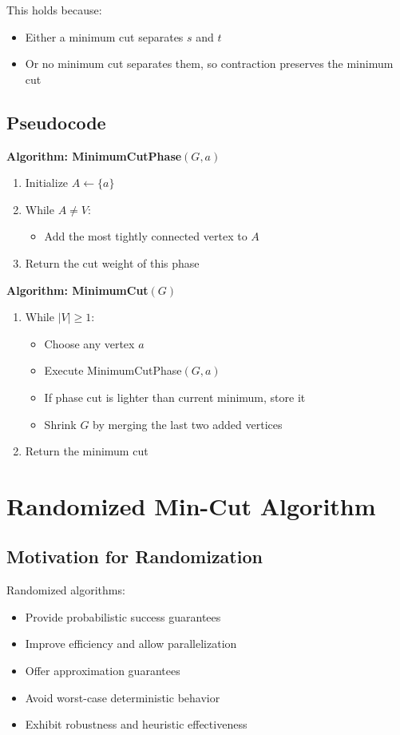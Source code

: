 \documentclass[12pt]{article}
\begin{document}
This holds because:
\begin{itemize}
    \item Either a minimum cut separates $s$ and $t$
    \item Or no minimum cut separates them, so contraction preserves the minimum cut
\end{itemize}

\subsection{Pseudocode}

\textbf{Algorithm: MinimumCutPhase$(G,a)$}
\begin{enumerate}
    \item Initialize $A \leftarrow \{a\}$
    \item While $A \neq V$:
    \begin{itemize}
        \item Add the most tightly connected vertex to $A$
    \end{itemize}
    \item Return the cut weight of this phase
\end{enumerate}

\textbf{Algorithm: MinimumCut$(G)$}
\begin{enumerate}
    \item While $|V| \ge 1$:
    \begin{itemize}
        \item Choose any vertex $a$
        \item Execute MinimumCutPhase$(G,a)$
        \item If phase cut is lighter than current minimum, store it
        \item Shrink $G$ by merging the last two added vertices
    \end{itemize}
    \item Return the minimum cut
\end{enumerate}

\section{Randomized Min-Cut Algorithm}

\subsection{Motivation for Randomization}
Randomized algorithms:
\begin{itemize}
    \item Provide probabilistic success guarantees
    \item Improve efficiency and allow parallelization
    \item Offer approximation guarantees
    \item Avoid worst-case deterministic behavior
    \item Exhibit robustness and heuristic effectiveness
\end{itemize}
\end{document}
